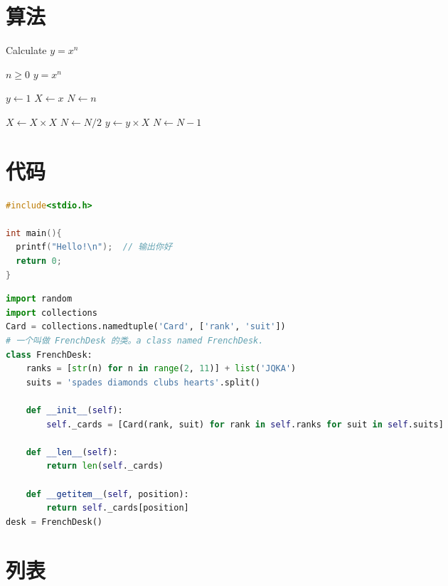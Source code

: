 \section{算法}

\renewcommand{\algorithmicrequire}{\textbf{输入：}\unskip}
\renewcommand{\algorithmicensure}{\textbf{输出：}\unskip}

\begin{algorithm}
  \caption{Calculate $y = x^n$}
  \label{alg1}
  \small
  \begin{algorithmic}
    \REQUIRE $n \geq 0$
    \ENSURE $y = x^n$

    \STATE $y \leftarrow 1$
    \STATE $X \leftarrow x$
    \STATE $N \leftarrow n$

        \STATE $X \leftarrow X \times X$
        \STATE $N \leftarrow N / 2$
      \ELSE[$N$ is odd]
        \STATE $y \leftarrow y \times X$
        \STATE $N \leftarrow N - 1$
      \ENDIF
    \ENDWHILE
  \end{algorithmic}
\end{algorithm}


\section{代码}

\begin{lstlisting}[language=c]
#include<stdio.h>

int main(){
  printf("Hello!\n");  // 输出你好
  return 0;
}
\end{lstlisting}

\begin{lstlisting}[language=python]
import random
import collections
Card = collections.namedtuple('Card', ['rank', 'suit'])
# 一个叫做 FrenchDesk 的类。a class named FrenchDesk.
class FrenchDesk:
    ranks = [str(n) for n in range(2, 11)] + list('JQKA')
    suits = 'spades diamonds clubs hearts'.split()
    
    def __init__(self):
        self._cards = [Card(rank, suit) for rank in self.ranks for suit in self.suits]
        
    def __len__(self):
        return len(self._cards)
        
    def __getitem__(self, position):
        return self._cards[position]
desk = FrenchDesk()
\end{lstlisting}


\section{列表}

